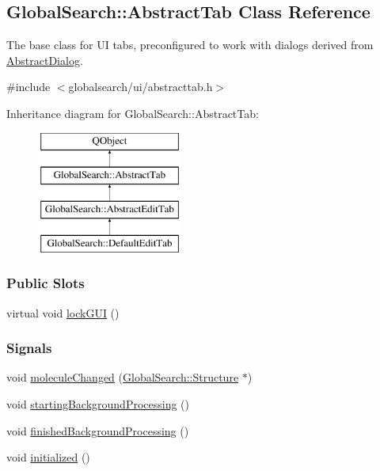 \hypertarget{classGlobalSearch_1_1AbstractTab}{}\subsection{Global\+Search\+:\+:Abstract\+Tab Class Reference}
\label{classGlobalSearch_1_1AbstractTab}


The base class for U\+I tabs, preconfigured to work with dialogs derived from \hyperlink{classGlobalSearch_1_1AbstractDialog}{Abstract\+Dialog}.  




{\ttfamily \#include $<$globalsearch/ui/abstracttab.\+h$>$}

Inheritance diagram for Global\+Search\+:\+:Abstract\+Tab\+:\begin{figure}[H]
\begin{center}
\leavevmode
\includegraphics[height=4.000000cm]{classGlobalSearch_1_1AbstractTab}
\end{center}
\end{figure}
\subsubsection*{Public Slots}
\begin{DoxyCompactItemize}
\item 
virtual void \hyperlink{classGlobalSearch_1_1AbstractTab_a82adaa8137d80906a35beebe92944a3e}{lock\+G\+U\+I} ()
\end{DoxyCompactItemize}
\subsubsection*{Signals}
\begin{DoxyCompactItemize}
\item 
void \hyperlink{classGlobalSearch_1_1AbstractTab_a343c4e401d69ec8364c5a0d53602bb02}{molecule\+Changed} (\hyperlink{classGlobalSearch_1_1Structure}{Global\+Search\+::\+Structure} $\ast$)
\item 
void \hyperlink{classGlobalSearch_1_1AbstractTab_a873c603fd50a66b14d47307aeaaa5fc8}{starting\+Background\+Processing} ()
\item 
void \hyperlink{classGlobalSearch_1_1AbstractTab_a5b06b32887aa1ba75cfcfad24f9c9a86}{finished\+Background\+Processing} ()
\item 
void \hyperlink{classGlobalSearch_1_1AbstractTab_aed63eed75abeb8c0e1e87344225f95cd}{initialized} ()
\end{DoxyCompactItemize}
